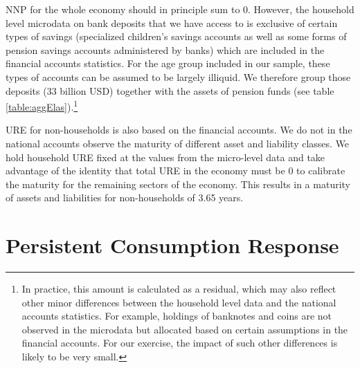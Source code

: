 \documentclass[titlepage]{\econtex}\newcommand{\texname}{ConsumptionHeterogeneity}
\begin{document}
NNP for the whole economy should in principle sum to 0. However, the household level microdata on bank deposits that we have access to is exclusive of certain types of savings (specialized children's savings accounts as well as some forms of pension savings accounts administered by banks) which are included in the financial accounts statistics. For the age group included in our sample, these types of accounts can be assumed to be largely illiquid. We therefore group those deposits (33 billion USD) together with the assets of pension funds (see table \ref{table:aggElas}).\footnote{In practice, this amount is calculated as a residual, which may also reflect other minor differences between the household level data and the national accounts statistics. For example, holdings of banknotes and coins are not observed in the microdata but allocated based on certain assumptions in the financial accounts. For our exercise, the impact of such other differences is likely to be very small.}

URE for non-households is also based on the financial accounts. We do not in the national accounts observe the maturity of different asset and liability classes. We hold household URE fixed at the values from the micro-level data and take advantage of the identity that total URE in the economy must be 0 to calibrate the maturity for the remaining sectors of the economy. This results in a maturity of assets and liabilities for non-households of 3.65 years.

\section{Persistent Consumption Response} \label{consumption_persistence_appendix}
\setcounter{figure}{0}   
\setcounter{table}{0} 
\end{document}

